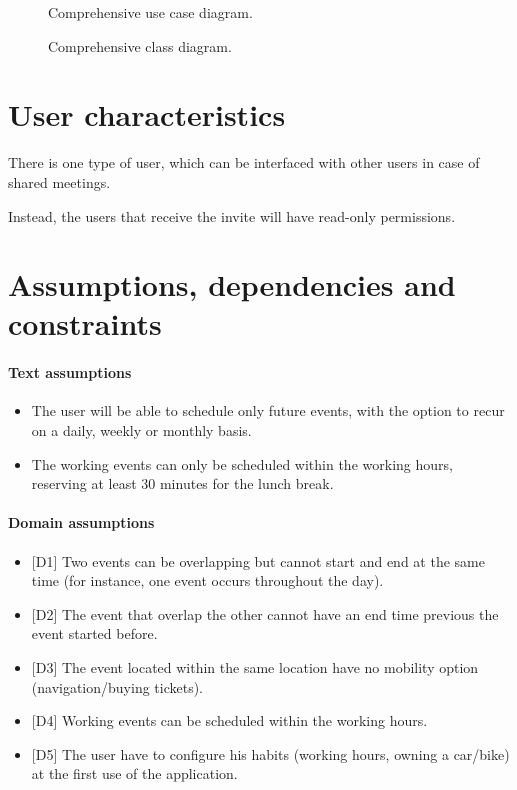\begin{figure}[H]
  \centerline{ }
  \caption{Comprehensive use case diagram.}   
\end{figure}

\begin{figure}[H]
 \centerline{ }
 \caption{Comprehensive class diagram.}  
\end{figure}

\section{User characteristics}
\label{sec:usercharacteristics}
\begin{description}
\item There is one type of user, which can be interfaced with other users in case of shared meetings.
\item Instead, the users that receive the invite will have read-only permissions.
\end{description}



\section{Assumptions, dependencies and constraints}
\label{sec:assumpdepenconst}

\paragraph{Text assumptions}
\begin{itemize}
\item The user will be able to schedule only future events, with the option to recur on a daily, weekly or monthly basis.
\item The working events can only be scheduled within the working hours, reserving at least 30 minutes for the lunch break.
\end{itemize}

\paragraph{Domain assumptions}
\begin{itemize}
\item {[D1]} Two events can be overlapping but cannot start and end at the same time (for instance, one event occurs throughout the day).
\item {[D2]} The event that overlap the other cannot have an end time previous the event started before.
\item {[D3]} The event located within the same location have no mobility option (navigation/buying tickets).
\item {[D4]} Working events can be scheduled within the working hours.
\item {[D5]} The user have to configure his habits (working hours, owning a car/bike) at the first use of the application.
\end{itemize}

